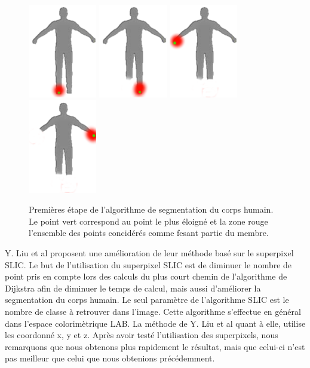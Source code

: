 \begin{figure}[!ht]
  \begin{center}
    \includegraphics[width=3cm]{image/humanFootR.png}
    \includegraphics[width=3cm]{image/humanFootL.png}
    \includegraphics[width=3cm]{image/humanHandR.png}
    \includegraphics[width=3cm]{image/humanHandL.png}
    \caption{Premières étape de l'algorithme de segmentation du corps humain. Le point vert correspond au point le plus éloigné et la zone rouge
    l'ensemble des points concidérés comme fesant partie du membre.}
    \label{fig:segmentation}
  \end{center}
\end{figure}

Y. Liu et al\cite{GIF} proposent une amélioration de leur méthode basé sur le superpixel SLIC\cite{SLIC}. Le but de l'utilisation du superpixel
SLIC est de diminuer le nombre de point pris en compte lors des calculs du plus court chemin de l'algorithme de Dijkstra afin de diminuer le 
temps de calcul, mais aussi d'améliorer la segmentation du corps humain. Le seul paramètre de l'algorithme SLIC est le nombre de classe à 
retrouver dans l'image. Cette algorithme s'effectue en général dans l'espace colorimètrique LAB. La méthode de Y. Liu et al\cite{GIF} quant à
elle, utilise les coordonné x, y et z. Après avoir testé l'utilisation des superpixels, nous remarquons que nous obtenons plus rapidement le résultat,
mais que celui-ci n'est pas meilleur que celui que nous obtenions précédemment.\\

